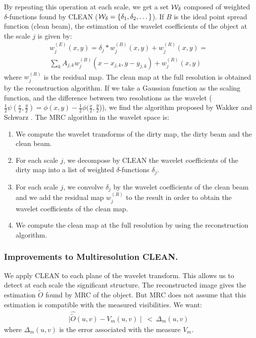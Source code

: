 \documentclass[11pt,a4paper]{article}
\begin{document}
 By repeating this operation at each scale, we get
a set ${\cal W}_\delta$ 
composed of weighted $\delta$-functions  found by CLEAN 
($ {\cal W}_\delta= \{\delta_1, \delta_2, \dots\}$).
If $B$ is the ideal point spread function (clean beam),
the estimation of the wavelet coefficients of the object at the scale $j$
is given by:
\begin{eqnarray}
w_j^{(E)}(x,y) = \delta_j * w_j^{(B)}(x,y) + w^{(R)}_j (x,y) = \\ \nonumber
\sum_k A_{j,k}
 w_j^{(B)}(x-x_{j,k},y-y_{j,k}) + w^{(R)}_j(x,y)
\end{eqnarray}
where $w^{(R)}_j $ is the residual map.
The clean map at the full resolution is obtained by the reconstruction 
algorithm.
If we take a Gaussian function as the scaling function, and the difference 
between
two resolutions as the wavelet ($\frac{1}{2}\psi
(\frac{x}{2},\frac{y}{2})=\phi(x,y) - 
\frac{1}{2}\phi(\frac{x}{2},\frac{y}{2}$)), we find the algorithm 
proposed by
Wakker and Schwarz \cite{rest:wakker88}. The MRC algorithm in the wavelet space is:
\begin{enumerate}
\item We compute the wavelet transforms of the dirty map, the dirty beam 
and the clean beam.
\item For each scale $j$, we decompose by CLEAN the wavelet coefficients 
of the 
dirty map into a list of weighted $\delta$-functions $\delta_j$.
\item For each scale $j$, we convolve  $\delta_j$ by the wavelet 
coefficients of the clean beam and we add the residual map $w^{(R)}_j$ 
to the result in order to obtain the  wavelet coefficients of the clean map.
\item We compute  the clean map at the full resolution by using the 
reconstruction algorithm.
\end{enumerate}

\subsubsection{Improvements to Multiresolution CLEAN.}

We apply CLEAN to each plane of the wavelet transform. This allows us to
detect at each scale the significant structure. The reconstructed image
 gives the estimation $\tilde{O}$ found by MRC of the object. But MRC does
not
assume that this estimation is compatible with the measured visibilities.
We want:
 \begin{eqnarray}
\mid \hat{\tilde{O}}(u,v) - V_m(u,v)\mid \ < \ \Delta_m(u,v)
\end{eqnarray}
 where $\Delta_m(u,v)$ is the error associated with the measure $V_m$.
\end{document}
